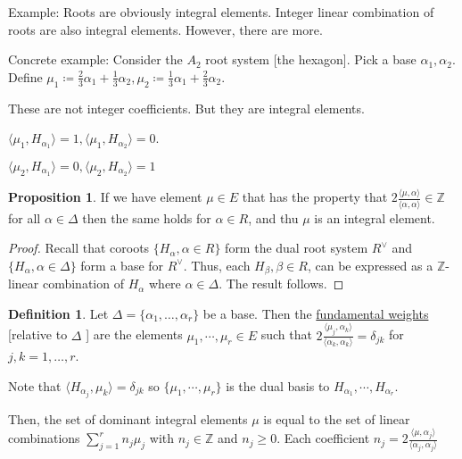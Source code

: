 \documentclass{article}
\theoremstyle{definition}
\newtheorem{definition}{Definition}
\newtheorem{proposition}{Proposition}
\begin{document}
Example: Roots are obviously integral elements. Integer linear combination of roots are also integral elements. However, there are more.

Concrete example: Consider the \(A_2\) root system [the hexagon]. Pick a base \(\alpha_1, \alpha_2\). Define \(\mu_1 \coloneqq \frac{2}{3}\alpha_1 + \frac{1}{3}\alpha_2, \mu_2 \coloneqq \frac{1}{3}\alpha_1 + \frac{2}{3}\alpha_2\).

These are not integer coefficients. But they are integral elements.

\(\langle \mu_1, H_{\alpha_1} \rangle = 1, \langle \mu_1, H_{\alpha_2} \rangle = 0\).

\(\langle \mu_2, H_{\alpha_1} \rangle = 0, \langle \mu_2, H_{\alpha_2} \rangle = 1\) 

\begin{proposition}
    If we have element \(\mu\in E\) that has the property that \(2 \frac{\langle \mu , \alpha  \rangle }{\langle \alpha ,\alpha  \rangle }\in \mathbb{Z}\) for all \(\alpha \in \Delta\) then the same holds for \(\alpha \in R\), and thu \(\mu\) is an integral element.
\end{proposition}

\begin{proof}
    Recall that coroots \(\{ H_\alpha , \alpha \in R \} \) form the dual root system \(R^\vee\) and \(\{ H_\alpha , \alpha \in \Delta  \} \) form a base for \(R^\vee\). Thus, each \(H_\beta ,\beta \in R\), can be expressed as a \(\mathbb{Z}\)-linear combination of \(H_\alpha\) where \(\alpha \in \Delta\). The result follows.
\end{proof}

\begin{definition}
    Let \(\Delta = \{ \alpha _1, \dots ,\alpha _r \} \) be a base. Then the \underline{fundamental weights} [relative to \(\Delta\) ] are the elements \(\mu_1,\cdots,\mu_r\in E\) such that \(2\frac{\langle \mu_j,\alpha_k \rangle }{\langle \alpha_k ,\alpha_k  \rangle } = \delta_{jk} \) for \(j,k=1,\dots ,r\). 
\end{definition}

Note that \(\langle H_{\alpha_j},\mu_k \rangle = \delta_{jk} \) so \(\{ \mu_1 , \cdots, \mu_r \} \) is the dual basis to \(H_{\alpha_1}, \cdots, H_{\alpha_r}\).

Then, the set of dominant integral elements \(\mu\) is equal to the set of linear combinations \(\sum_{j=1}^{r} n_j \mu_j\) with \(n_j\in \mathbb{Z} \) and \(n_j \geq 0\). Each coefficient \(n_j = 2 \frac{\langle \mu, \alpha_j \rangle }{\langle \alpha_j, \alpha_j \rangle }\) 
\end{document}
